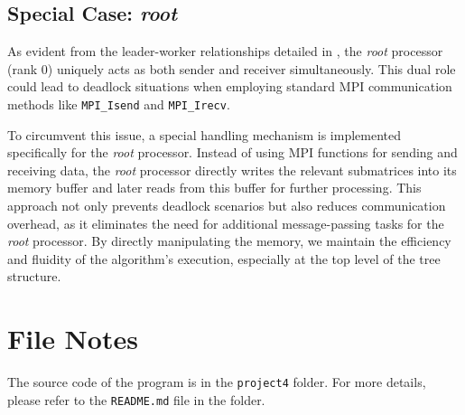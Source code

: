 \documentclass[12pt,a4paper]{article}
\begin{document}
\subsection{Special Case: \textit{root}}
\label{subsec:special_case_root}
As evident from the leader-worker relationships detailed in , the \textit{root} processor (rank 0) 
 uniquely acts as both sender and receiver simultaneously. 
 This dual role could lead to deadlock situations when employing standard MPI communication methods like \texttt{MPI\_Isend} and \texttt{MPI\_Irecv}.

To circumvent this issue, a special handling mechanism is implemented specifically for the \textit{root} processor. Instead of using MPI functions for sending and receiving data, the \textit{root} processor directly writes the relevant submatrices into its memory buffer and later reads from this buffer for further processing. This approach not only prevents deadlock scenarios but also reduces communication overhead, as it eliminates the need for additional message-passing tasks for the \textit{root} processor. By directly manipulating the memory, we maintain the efficiency and fluidity of the algorithm's execution, especially at the top level of the tree structure.





\section*{File Notes}
The source code of the program is in the \texttt{project4} folder. 
For more details, please refer to the \texttt{README.md} file in the folder.
\end{document}
